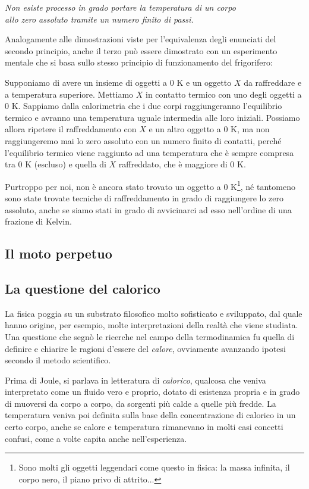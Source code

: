 \begin{center}
    \textit{Non esiste processo in grado portare la temperatura di un corpo\\allo
    zero assoluto tramite un numero finito di passi.}
\end{center}

\noindent Analogamente alle dimostrazioni viste per l'equivalenza
degli enunciati del secondo principio, anche il terzo può essere
dimostrato con un esperimento mentale che si basa sullo stesso principio
di funzionamento del frigorifero:

Supponiamo di avere un insieme di oggetti a 0 K e un oggetto $X$ da
raffreddare e a temperatura superiore. Mettiamo $X$ in
contatto termico con uno degli oggetti a 0 K. Sappiamo dalla calorimetria
che i due corpi raggiungeranno l'equilibrio termico e avranno una
temperatura uguale intermedia alle loro iniziali. Possiamo allora
ripetere il raffreddamento con $X$ e un altro oggetto a 0 K, ma
non raggiungeremo mai lo zero assoluto con un numero finito di
contatti, perché l'equilibrio termico viene raggiunto ad una temperatura
che è sempre compresa tra 0 K (escluso) e quella di $X$ raffreddato, che
è maggiore di 0 K.

Purtroppo per noi, non è ancora stato trovato un oggetto a 0 K\footnote{Sono
molti gli oggetti leggendari come questo in fisica: la massa infinita, il
corpo nero, il piano privo di attrito...}, né tantomeno sono state
trovate tecniche di raffreddamento in grado di raggiungere lo zero
assoluto, anche se siamo stati in grado di avvicinarci ad esso
nell'ordine di una frazione di Kelvin.

\subsection{Il moto perpetuo}


\subsection{La questione del calorico}
La fisica poggia su un substrato filosofico molto sofisticato e
sviluppato, dal quale hanno origine, per esempio, molte interpretazioni
della realtà che viene studiata. Una questione che segnò le ricerche
nel campo della termodinamica fu quella di definire e chiarire le
ragioni d'essere del \textit{calore}, ovviamente avanzando ipotesi
secondo il metodo scientifico.

Prima di Joule, si parlava in letteratura di \textit{calorico},
qualcosa che veniva interpretato come un fluido vero e proprio,
dotato di esistenza propria e in grado di muoversi da corpo a
corpo, da sorgenti più calde a quelle più fredde. La temperatura
veniva poi definita sulla base della concentrazione di calorico
in un certo corpo, anche se calore e temperatura rimanevano in
molti casi concetti confusi, come a volte capita anche nell'esperienza.

